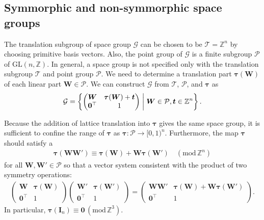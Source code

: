 \subsection{\label{sec:vector_system}Symmorphic and non-symmorphic space groups}

The translation subgroup of space group $\mathcal{G}$ can be chosen to be $\mathcal{T} = \mathbb{Z}^{n}$ by choosing primitive basis vectors.
Also, the point group of $\mathcal{G}$ is a finite subgroup $\mathcal{P}$ of $\mathrm{GL}(n, \mathbb{Z})$.
In general, a space group is not specified only with the translation subgroup $\mathcal{T}$ and point group $\mathcal{P}$.
We need to determine a translation part $\bm{\tau}(\bm{W})$ of each linear part $\bm{W} \in \mathcal{P}$.
We can construct $\mathcal{G}$ from $\mathcal{T}$, $\mathcal{{P}}$, and $\bm{\tau}$ as
\begin{align}
  \mathcal{G} = \left\{ 
    \begin{pmatrix}
      \bm{W} & \bm{\tau}(\bm{W}) + \bm{t} \\
      \bm{0}^{\top} & 1 \\
    \end{pmatrix}
   \mathrel{}\middle|\mathrel{} 
    \bm{W} \in \mathcal{P}, \bm{t} \in \mathbb{Z}^{n}
   \right\}.
\end{align}

Because the addition of lattice translation into $\bm{\tau}$ gives the same space group, it is sufficient to confine the range of $\bm{\tau}$ as $\bm{\tau}: \mathcal{P} \to [0, 1)^{n}$.
Furthermore, the map $\bm{\tau}$ should satisfy a 
\begin{align}
  \label{eq:cocycle_condition}
  \bm{\tau}(\bm{W}\bm{W}') \equiv \bm{\tau}(\bm{W}) + \bm{W} \bm{\tau}(\bm{W}') \quad ( \mathrm{mod} \, \mathbb{Z}^{n})
\end{align}
for all $\bm{W}, \bm{W}' \in \mathcal{P}$ so that a vector system consistent with the product of two symmetry operations:
\begin{align*}
  \begin{pmatrix}
    \bm{W} & \bm{\tau}(\bm{W}) \\
    \bm{0}^{\top} & 1
  \end{pmatrix}
  \begin{pmatrix}
    \bm{W}' & \bm{\tau}(\bm{W}') \\
    \bm{0}^{\top} & 1
  \end{pmatrix}
  =
  \begin{pmatrix}
    \bm{W}\bm{W}' & \bm{\tau}(\bm{W}) + \bm{W} \bm{\tau}(\bm{W}') \\
    \bm{0}^{\top} & 1
  \end{pmatrix}.
\end{align*}
In particular, $\bm{\tau}(\bm{I}_{n}) \equiv \bm{0} \, (\mathrm{mod}\, \mathbb{Z}^{3})$.

